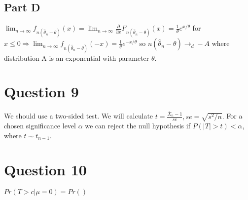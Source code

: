\documentclass[11pt]{article} %
\begin{document}
\subsection{Part D}
$\lim_{n\rightarrow \infty}f_{n(\hat{\theta}_n - \theta)}(x) =\lim_{n\rightarrow \infty} \frac{\partial}{\partial x}F_{n(\hat{\theta}_n - \theta)}(x) = \frac{1}{\theta}e^{x/\theta}  $ for $x\leq0 \Rightarrow \lim_{n\rightarrow \infty}f_{n(\hat{\theta}_n - \theta)}(-x) = \frac{1}{\theta}e^{-x/\theta} $ so $n(\hat{\theta}_n - \theta)\rightarrow_d -A$ where distribution A is an exponential with parameter $\theta$.

\section{Question 9} %
We should use a two-sided test. We will calculate $t = \frac{\bar{X}_n - 1}{se},se = \sqrt{s^2/n}.$ For a chosen significance level $\alpha$ we can reject the null hypothesis if $P(|T|> t) < \alpha$, where $t \sim t_{n-1}$.

\section{Question 10}  %
$Pr(T>c|\mu = 0) = Pr()$
\end{document}
